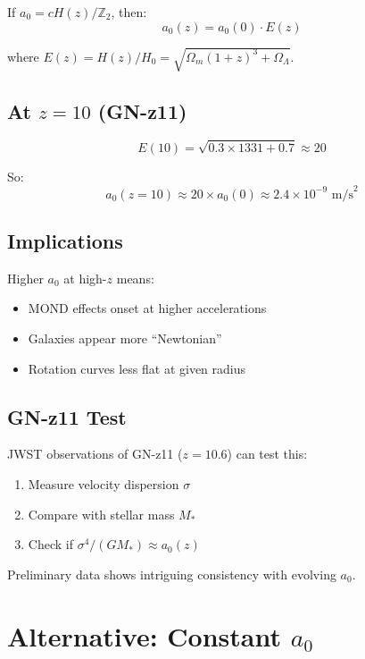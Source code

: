 \documentclass[12pt,a4paper]{article}
\begin{document}
If $a_0 = cH(z)/\mathbb{Z}_2$, then:
\begin{equation}
a_0(z) = a_0(0) \cdot E(z)
\end{equation}

where $E(z) = H(z)/H_0 = \sqrt{\Omega_m(1+z)^3 + \Omega_\Lambda}$.

\subsection{At $z = 10$ (GN-z11)}

\begin{equation}
E(10) = \sqrt{0.3 \times 1331 + 0.7} \approx 20
\end{equation}

So:
\begin{equation}
a_0(z=10) \approx 20 \times a_0(0) \approx 2.4 \times 10^{-9} \text{ m/s}^2
\end{equation}

\subsection{Implications}

Higher $a_0$ at high-$z$ means:
\begin{itemize}
    \item MOND effects onset at higher accelerations
    \item Galaxies appear more ``Newtonian''
    \item Rotation curves less flat at given radius
\end{itemize}

\subsection{GN-z11 Test}

JWST observations of GN-z11 ($z = 10.6$) can test this:
\begin{enumerate}
    \item Measure velocity dispersion $\sigma$
    \item Compare with stellar mass $M_*$
    \item Check if $\sigma^4/(GM_*) \approx a_0(z)$
\end{enumerate}

Preliminary data shows intriguing consistency with evolving $a_0$.

\section{Alternative: Constant $a_0$}
\end{document}

